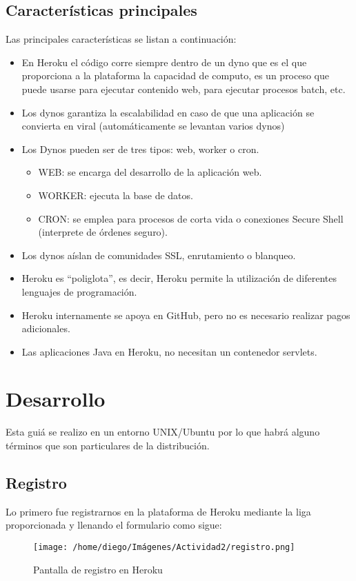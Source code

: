 \documentclass{article}
\begin{document}
		\subsection{Características principales}
			Las principales características se listan a continuación:
			\begin{itemize}
				\item En Heroku el código corre siempre dentro de un dyno que es el que proporciona a la plataforma la capacidad de computo, es un proceso que puede usarse para ejecutar contenido web, para ejecutar procesos batch, etc.
				\item Los dynos garantiza la escalabilidad en caso de que una aplicación se convierta en viral (automáticamente se levantan varios dynos)
				\item Los Dynos pueden ser de tres tipos: web, worker o cron.
					\begin{itemize}
						\item WEB: se encarga del desarrollo de la aplicación web.
						\item WORKER: ejecuta la base de datos.
						\item CRON: se emplea para procesos de corta vida o conexiones Secure Shell (interprete de órdenes seguro).
					\end{itemize}
				\item Los dynos aíslan de comunidades SSL, enrutamiento o blanqueo.
				\item Heroku es “poliglota”, es decir, Heroku permite la utilización de diferentes lenguajes de programación.
				\item Heroku internamente se apoya en GitHub, pero no es necesario realizar pagos adicionales.
				\item Las aplicaciones Java en Heroku, no necesitan un contenedor servlets.
			\end{itemize} 
	\section{Desarrollo}
		Esta guiá se realizo en un entorno UNIX/Ubuntu por lo que habrá alguno términos que son particulares de la distribución.
		\newpage
		\subsection{Registro}
		Lo primero fue registrarnos en la plataforma de Heroku mediante la liga proporcionada y llenando el formulario como sigue:
		\begin{figure}[h]
			\centering
			\texttt{[image: /home/diego/Imágenes/Actividad2/registro.png]}
			\caption{Pantalla de registro en Heroku}
		\end{figure}
		\newpage
\end{document}
